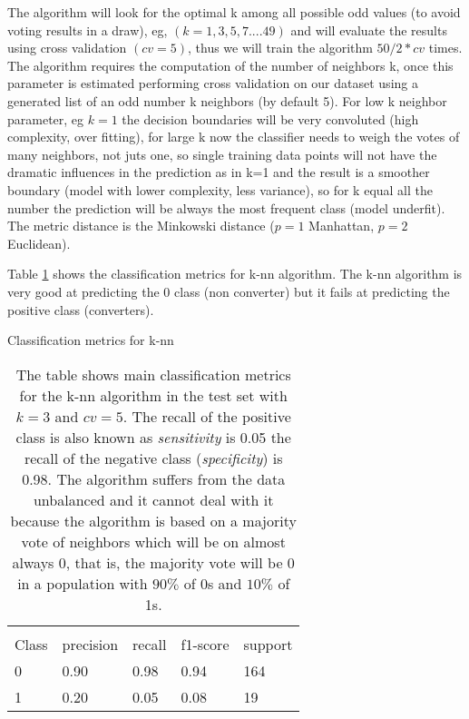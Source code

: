 \documentclass[11pt]{article}
\theoremstyle{definition}
\theoremstyle{remark}
\begin{document}
The algorithm will look for the optimal k among all possible odd values (to avoid voting results in a draw), eg, $(k=1,3,5,7....49)$ and will evaluate the results using cross validation $(cv=5)$, thus we will train the algorithm $50/2*cv$ times. 
The algorithm requires the computation of the number of neighbors k, once this parameter is estimated performing cross validation on our dataset using a generated list of an odd number k neighbors (by default 5). For low k neighbor parameter, eg $k=1$ the decision boundaries will be very convoluted (high complexity, over fitting), for large k now the classifier needs to weigh the votes of many neighbors, not juts one, so single training data points will not have the dramatic influences in the prediction as in k=1 and the result is a smoother boundary (model with lower complexity, less variance), so for k equal all the number the prediction will be always the most frequent class (model underfit). The metric distance is the Minkowski distance ($p=1$ Manhattan, $p=2$ Euclidean).


Table \ref{tab:knn} shows the classification metrics for k-nn algorithm. The k-nn algorithm is very good at predicting the 0 class (non converter) but it fails at predicting the positive class (converters).
\begin{table}[H]
\caption{Classification metrics for k-nn} 
\begin{center} 
\begin{tabular}{lllll}
\hline
\multicolumn{1}{c}{} \\
Class & precision & recall & f1-score & support     \\
\hline
0 & 0.90  &    0.98   &   0.94   &    164 \\
1 & 0.20  &    0.05   &   0.08   &     19 \\
\hline
\end{tabular}
\caption{The table shows  main classification metrics for the k-nn algorithm in the test set with $k=3$ and $cv=5$. The recall of the positive class is also known as \emph{sensitivity} is 0.05 the  recall of the negative class (\emph{specificity}) is 0.98. The algorithm suffers from the data unbalanced and it cannot deal with it because the algorithm is based on a majority vote of neighbors which will be on almost always 0, that is, the majority vote will be 0 in a population with $90\%$ of 0s and $10\%$ of 1s.} \label{tab:knn} 
\end{center}
\end{table}
\end{document}
